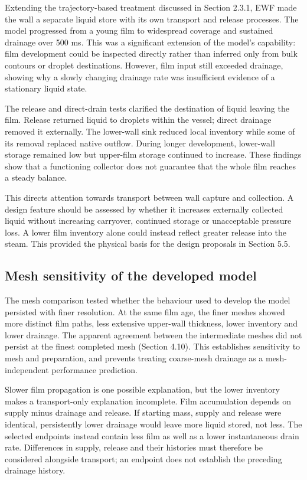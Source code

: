 \documentclass[12pt]{article}
\begin{document}
Extending the trajectory-based treatment discussed in Section 2.3.1, EWF made the wall a separate liquid store with its own transport and release processes. The model progressed from a young film to widespread coverage and sustained drainage over 500 ms. This was a significant extension of the model's capability: film development could be inspected directly rather than inferred only from bulk contours or droplet destinations. However, film input still exceeded drainage, showing why a slowly changing drainage rate was insufficient evidence of a stationary liquid state.

The release and direct-drain tests clarified the destination of liquid leaving the film. Release returned liquid to droplets within the vessel; direct drainage removed it externally. The lower-wall sink reduced local inventory while some of its removal replaced native outflow. During longer development, lower-wall storage remained low but upper-film storage continued to increase. These findings show that a functioning collector does not guarantee that the whole film reaches a steady balance.

This directs attention towards transport between wall capture and collection. A design feature should be assessed by whether it increases externally collected liquid without increasing carryover, continued storage or unacceptable pressure loss. A lower film inventory alone could instead reflect greater release into the steam. This provided the physical basis for the design proposals in Section 5.5.

\subsection{Mesh sensitivity of the developed model}\label{mesh-sensitivity-of-the-developed-model}

The mesh comparison tested whether the behaviour used to develop the model persisted with finer resolution. At the same film age, the finer meshes showed more distinct film paths, less extensive upper-wall thickness, lower inventory and lower drainage. The apparent agreement between the intermediate meshes did not persist at the finest completed mesh (Section 4.10). This establishes sensitivity to mesh and preparation, and prevents treating coarse-mesh drainage as a mesh-independent performance prediction.

Slower film propagation is one possible explanation, but the lower inventory makes a transport-only explanation incomplete. Film accumulation depends on supply minus drainage and release. If starting mass, supply and release were identical, persistently lower drainage would leave more liquid stored, not less. The selected endpoints instead contain less film as well as a lower instantaneous drain rate. Differences in supply, release and their histories must therefore be considered alongside transport; an endpoint does not establish the preceding drainage history.
\end{document}
